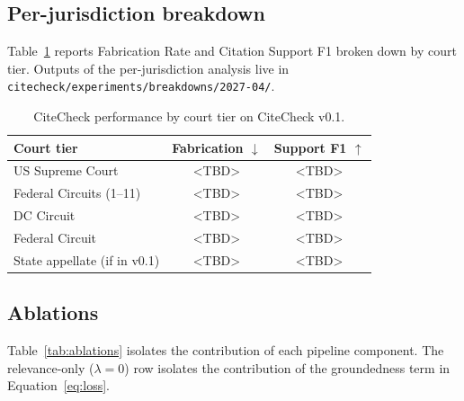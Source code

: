 \documentclass[11pt]{article}
\begin{document}
\subsection{Per-jurisdiction breakdown}
\label{sec:results:perjurisdiction}

Table~\ref{tab:perjurisdiction} reports Fabrication Rate and Citation
Support F1 broken down by court tier. Outputs of the per-jurisdiction
analysis live in \texttt{citecheck/experiments/breakdowns/2027-04/}.

\begin{table}[t]
\centering
\small
\begin{tabular}{lcc}
\toprule
\textbf{Court tier} & \textbf{Fabrication $\downarrow$}
                    & \textbf{Support F1 $\uparrow$} \\
\midrule
US Supreme Court             & <TBD> & <TBD> \\
Federal Circuits (1--11)     & <TBD> & <TBD> \\
DC Circuit                   & <TBD> & <TBD> \\
Federal Circuit              & <TBD> & <TBD> \\
State appellate (if in v0.1) & <TBD> & <TBD> \\
\bottomrule
\end{tabular}
\caption{CiteCheck performance by court tier on CiteCheck v0.1.}
\label{tab:perjurisdiction}
\end{table}

\subsection{Ablations}
\label{sec:results:ablations}

Table~\ref{tab:ablations} isolates the contribution of each pipeline
component. The relevance-only ($\lambda = 0$) row isolates the
contribution of the groundedness term in Equation~\ref{eq:loss}.
\end{document}

